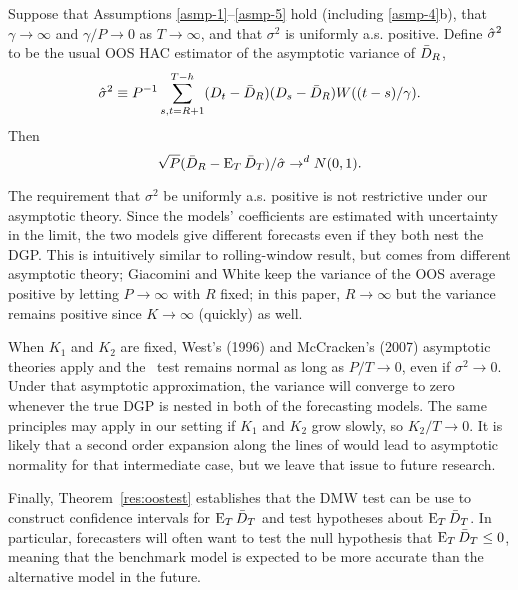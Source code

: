 \documentclass[12pt]{article}
\begin{document}
\begin{thm}\label{res-oost}
  Suppose that Assumptions \ref{asmp-1}--\ref{asmp-5} hold (including
  \ref{asmp-4}b), that $\gamma \to \infty$ and $\gamma/P \to 0$ as $T
  \to \infty$, and that $\sigma^2$ is uniformly a.s. positive. Define
  $\hat{\sigma}^2$ to be the usual OOS HAC estimator of the asymptotic variance
  of $\bar{D}_{R}$,
  \begin{equation}
    \hat{\sigma}^2 \equiv P^{-1} \sum_{s,t=R+1}^{T-h} (D_t - \bar{D}_{R})(D_s - \bar{D}_{R})
    W((t-s)/\gamma).
  \end{equation}
  Then
  \begin{equation}
    \sqrt{P}(\bar{D}_{R} - \operatorname{E}_T\bar{D}_{T})/\hat{\sigma} \to^d N(0,1).
  \end{equation}
\end{thm}

The requirement that $\sigma^2$ be uniformly a.s. positive is not
restrictive under our asymptotic theory. Since the models'
coefficients are estimated with uncertainty in the limit, the two
models give different forecasts even if they both nest the DGP.  This
is intuitively similar to  rolling-window result, but
comes from different asymptotic theory; Giacomini and White keep the
variance of the OOS average positive by letting $P \to \infty$ with
$R$ fixed; in this paper, $R \to \infty$ but the variance remains
positive since $K \to \infty$ (quickly) as well.

When $K_1$ and $K_2$ are fixed, West's (1996) and McCracken's (2007)
asymptotic theories apply and the \oost\ test remains normal as long
as $P/T \to 0$, even if $\sigma^2 \to 0$. Under that asymptotic
approximation, the variance will converge to zero whenever the true
DGP is nested in both of the forecasting models. The same principles
may apply in our setting if $K_1$ and $K_2$ grow slowly, so $K_2/T \to
0$. It is likely that a second order expansion along the lines of
\citet{Mcc:07} would lead to asymptotic normality for that
intermediate case, but we leave that issue to future research.

Finally, Theorem~\ref{res:oostest} establishes that the DMW test can be
use to construct confidence intervals for $\operatorname{E}_T \bar{D}_{T}$ and test
hypotheses about $\operatorname{E}_T \bar{D}_{T}$. In particular, forecasters will often
want to test the null hypothesis that $\operatorname{E}_T \bar{D}_{T} \leq 0$, meaning
that the benchmark model is expected to be more accurate than the
alternative model in the future.
\end{document}

